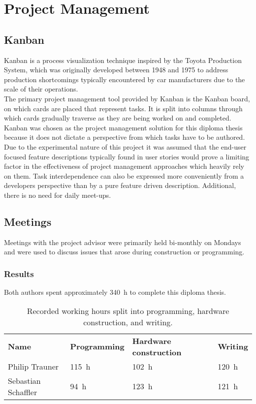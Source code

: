\chapter{Project Management}
\author{Philip Trauner}
\section{Kanban}
Kanban is a process visualization technique inspired by the Toyota Production System, which was originally developed between 1948 and 1975 to address production shortcomings typically encountered by car manufacturers due to the scale of their operations. \\

The primary project management tool provided by Kanban is the Kanban board, on which cards are placed that represent tasks. It is split into columns through which cards gradually traverse as they are being worked on and completed. \\

Kanban was chosen as the project management solution for this diploma thesis because it does not dictate a perspective from which tasks have to be authored. Due to the experimental nature of this project it was assumed that the end-user focused feature descriptions typically found in user stories would prove a limiting factor in the effectiveness of project management approaches which heavily rely on them. Task interdependence can also be expressed more conveniently from a developers perspective than by a pure feature driven description. Additional, there is no need for daily meet-ups.

\section{Meetings}
Meetings with the project advisor were primarily held bi-monthly on Mondays and were used to discuss issues that arose during construction or programming.

\subsection{Results}
Both authors spent approximately \SI{340}{\hour} to complete this diploma thesis.

\begin{table}[H]
\centering
\begin{tabular}{llll}
\textbf{Name}       & \textbf{Programming} & \textbf{Hardware construction} & \textbf{Writing} \\
Philip Trauner      & \SI{115}{\hour} & \SI{102}{\hour} & \SI{120}{\hour} \\
Sebastian Schaffler & \SI{94}{\hour} & \SI{123}{\hour} & \SI{121}{\hour}            
\end{tabular}
\caption{Recorded working hours split into programming, hardware construction, and writing.}
\end{table}